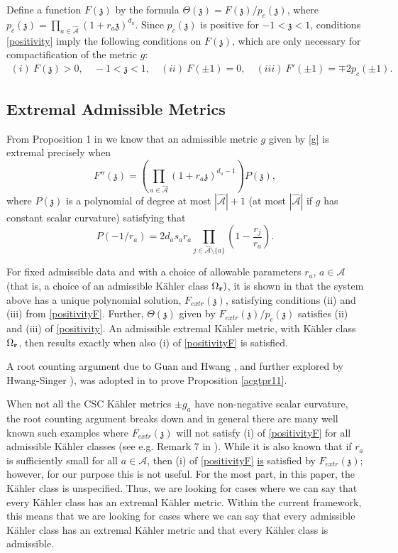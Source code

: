 \documentclass[12pt]{amsart}
\def\bfr{{\bf r}}
\def\cala{{\mathcal A}}
\def\gz{{\mathfrak z}}
\begin{document}
Define a function $F(\gz)$ by the formula $\Theta(\gz)=F(\gz)/p_c(\gz)$, where
$p_c(\gz) = \prod_{a \in \hat{\cala}} (1 + r_a \gz)^{d_{a}}$.
Since $p_c(\gz)$ is positive for $-1<\gz<1$, conditions
\eqref{positivity}
imply the following conditions on $F(\gz)$, which are only necessary
for compactification of the metric $g$:
\begin{align}
\label{positivityF}
(i)\ F(\gz) > 0, \quad -1 < \gz <1,\quad
(ii)\ F(\pm 1) = 0,\quad
(iii)\ F'(\pm 1) = \mp 2p_c(\pm1).
\end{align}

\subsection{Extremal Admissible Metrics} 
From Proposition 1 in \cite{ACGT08} we know that an admissible metric $g$ given by \eqref{g} is extremal precisely when 
$$F''(\gz) = \left(\prod_{a \in \hat{\cala}} (1+r_a \gz)^{d_a -1} \right)P(\gz),$$
where $P(\gz)$ is a polynomial of degree at most $|\hat{\cala}| +1$ (at most $|\hat{\cala}|$ if $g$ has constant scalar curvature) satisfying that
$$P(-1/r_a) = 2 d_a s_a r_a \prod_{j\in \hat{\cala}\setminus \{a\} }\left( 1-\frac{r_j}{r_a} \right).$$

For fixed admissible data and with a choice of allowable parameters $r_a$, $a\in \cala$ (that is, a choice of an admissible K\"ahler class 
$\Omega_{\bfr})$, it is shown in \cite{ACGT08} that the system above has a unique polynomial solution, $F_{extr}(\gz)$, satisfying
conditions (ii) and (iii) from \eqref{positivityF}. Further, $\Theta(\gz)$ given by $F_{extr}(\gz)/p_c(\gz)$ satisfies (ii) and (iii) of \eqref{positivity}.
An admissible extremal K\"ahler metric, with K\"ahler class $\Omega_{\bfr}$, then results exactly when also (i) of \eqref{positivityF} 
is satisfied.

A root counting argument due to 
Guan \cite{Gua95} and Hwang \cite{Hwa94}, and further explored by Hwang-Singer \cite{HwaSi02}), was adopted in \cite{ACGT08}
to prove Proposition \ref{acgtpr11}.

When not all the CSC K\"ahler metrics $\pm g_a$ have non-negative scalar curvature, the root counting argument breaks down and in general there are many well known such examples where $F_{extr}(\gz)$ will not satisfy (i) of \eqref{positivityF} for all admissible K\"ahler classes (see e.g. Remark 7 in \cite{ACGT08}). While it is also known that if $r_a$ is sufficiently small for all $a\in \cala$, then (i) of \eqref{positivityF} \underline{is} satisfied by $F_{extr}(\gz)$; however, for our purpose this is not useful. For the most part, in this paper, the K\"ahler class is unspecified. Thus, we are looking for cases where we can say that every K\"ahler class has an extremal K\"ahler metric. 
Within the current framework, this means that we are looking for cases where we can say that every admissible K\"ahler class has an extremal K\"ahler metric and that every K\"ahler class is admissible. 
\end{document}
